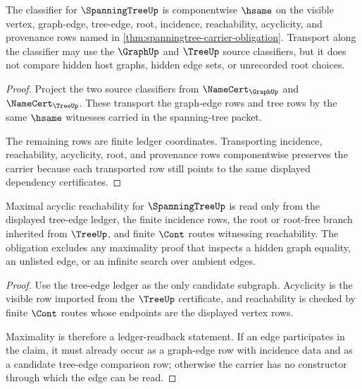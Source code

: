 \begin{theorem}
\label{thm:spanningtree-classifier-obligation}
The classifier for $\SpanningTreeUp$ is componentwise $\hsame$ on the visible vertex, graph-edge, tree-edge, root, incidence, reachability, acyclicity, and provenance rows named in \autoref{thm:spanningtree-carrier-obligation}. Transport along the classifier may use the $\GraphUp$ and $\TreeUp$ source classifiers, but it does not compare hidden host graphs, hidden edge sets, or unrecorded root choices.
\end{theorem}
\begin{proof}
Project the two source classifiers from $\NameCert_{\GraphUp}$ and $\NameCert_{\TreeUp}$. These transport the graph-edge rows and tree rows by the same $\hsame$ witnesses carried in the spanning-tree packet.

The remaining rows are finite ledger coordinates. Transporting incidence, reachability, acyclicity, root, and provenance rows componentwise preserves the carrier because each transported row still points to the same displayed dependency certificates.
\end{proof}

\begin{theorem}
\label{thm:spanningtree-acyclic-maximality-obligation}
Maximal acyclic reachability for $\SpanningTreeUp$ is read only from the displayed tree-edge ledger, the finite incidence rows, the root or root-free branch inherited from $\TreeUp$, and finite $\Cont$ routes witnessing reachability. The obligation excludes any maximality proof that inspects a hidden graph equality, an unlisted edge, or an infinite search over ambient edges.
\end{theorem}
\begin{proof}
Use the tree-edge ledger as the only candidate subgraph. Acyclicity is the visible row imported from the $\TreeUp$ certificate, and reachability is checked by finite $\Cont$ routes whose endpoints are the displayed vertex rows.

Maximality is therefore a ledger-readback statement. If an edge participates in the claim, it must already occur as a graph-edge row with incidence data and as a candidate tree-edge comparison row; otherwise the carrier has no constructor through which the edge can be read.
\end{proof}

